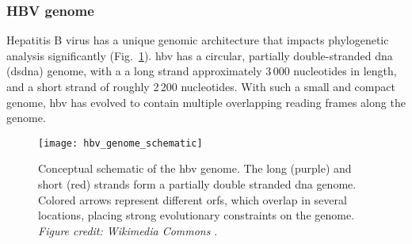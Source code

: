 

\subsubsection{HBV genome}
Hepatitis B virus has a unique genomic architecture that impacts phylogenetic analysis significantly (Fig.~\ref{fig:hbvGenome}).
\gls{hbv} has a circular, partially double-stranded \gls{dna} (ds\gls{dna}) genome, with a a long strand approximately 3\,000 nucleotides in length, and a short strand of roughly 2\,200 nucleotides.
With such a small and compact genome, \gls{hbv} has evolved to contain multiple overlapping reading frames along the genome.

\begin{figure}[ht]
  \centering
  \texttt{[image: hbv\_genome\_schematic]}
  \caption[Schematic of the hepatitis B virus genome]{Conceptual schematic of the \gls{hbv} genome. The long (purple) and short (red) strands form a partially double stranded \gls{dna} genome. Colored arrows represent different \gls{orf}s, which overlap in several locations, placing strong evolutionary constraints on the genome. \textit{Figure credit: Wikimedia Commons} \citep{commons2016file}.
  }
  \label{fig:hbvGenome}
\end{figure}


